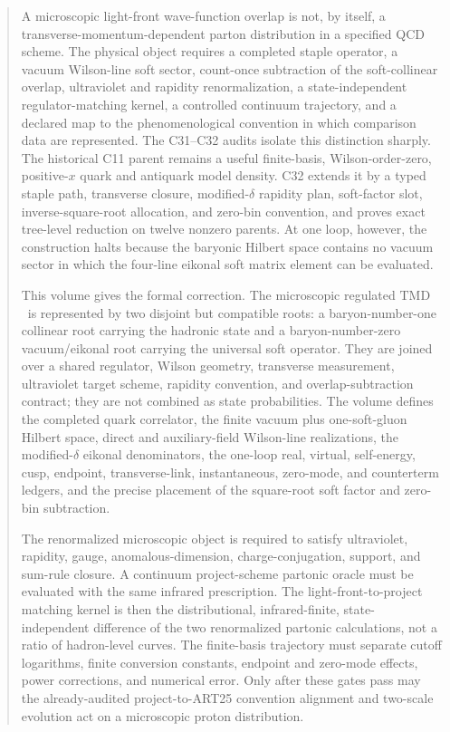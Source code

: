 \documentclass[11pt]{article}
\newcommand{\TMD}{\ensuremath{\mathrm{TMD}}}
\begin{document}
\begin{abstract}
A microscopic light-front wave-function overlap is not, by itself, a transverse-momentum-dependent parton distribution in a specified QCD scheme.  The physical object requires a completed staple operator, a vacuum Wilson-line soft sector, count-once subtraction of the soft-collinear overlap, ultraviolet and rapidity renormalization, a state-independent regulator-matching kernel, a controlled continuum trajectory, and a declared map to the phenomenological convention in which comparison data are represented.  The C31--C32 audits isolate this distinction sharply.  The historical C11 parent remains a useful finite-basis, Wilson-order-zero, positive-\(x\) quark and antiquark model density.  C32 extends it by a typed staple path, transverse closure, modified-\(\delta\) rapidity plan, soft-factor slot, inverse-square-root allocation, and zero-bin convention, and proves exact tree-level reduction on twelve nonzero parents.  At one loop, however, the construction halts because the baryonic Hilbert space contains no vacuum sector in which the four-line eikonal soft matrix element can be evaluated.

This volume gives the formal correction.  The microscopic regulated \TMD\ is represented by two disjoint but compatible roots: a baryon-number-one collinear root carrying the hadronic state and a baryon-number-zero vacuum/eikonal root carrying the universal soft operator.  They are joined over a shared regulator, Wilson geometry, transverse measurement, ultraviolet target scheme, rapidity convention, and overlap-subtraction contract; they are not combined as state probabilities.  The volume defines the completed quark correlator, the finite vacuum plus one-soft-gluon Hilbert space, direct and auxiliary-field Wilson-line realizations, the modified-\(\delta\) eikonal denominators, the one-loop real, virtual, self-energy, cusp, endpoint, transverse-link, instantaneous, zero-mode, and counterterm ledgers, and the precise placement of the square-root soft factor and zero-bin subtraction.

The renormalized microscopic object is required to satisfy ultraviolet, rapidity, gauge, anomalous-dimension, charge-conjugation, support, and sum-rule closure.  A continuum project-scheme partonic oracle must be evaluated with the same infrared prescription.  The light-front-to-project matching kernel is then the distributional, infrared-finite, state-independent difference of the two renormalized partonic calculations, not a ratio of hadron-level curves.  The finite-basis trajectory must separate cutoff logarithms, finite conversion constants, endpoint and zero-mode effects, power corrections, and numerical error.  Only after these gates pass may the already-audited project-to-ART25 convention alignment and two-scale evolution act on a microscopic proton distribution.


\end{abstract}
\end{document}
